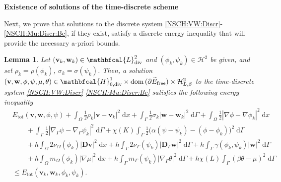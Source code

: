 \documentclass[11pt,reqno]{amsart}
\newtheorem{lemma}[theorem]{Lemma}
\theoremstyle{remark}
\numberwithin{equation}{section}
\newcommand{\abs}[1]{|#1|}
\newcommand{\intO}{\int_\Omega}
\newcommand{\intG}{\int_\Gamma}
\newcommand{\dx}{\;\mathrm{d}x}
\newcommand{\dG}{\;\mathrm d\Ga}
\newcommand{\Grad}{\nabla}
\newcommand{\Div}{\textnormal{div}}
\newcommand{\Gradg}{\nabla_\Ga}
\newcommand{\Om}{\Omega}
\newcommand{\Ga}{\Gamma}
\newcommand{\bv}{\mathbf v}
\newcommand{\bw}{\mathbf w}
\newcommand{\D}{\mathbf D}
\newcommand{\Dg}{\mathbf D_\Ga}
\newcommand{\free}{\mathrm{free}}
\begin{document}
\noindent
\textbf{Existence of solutions of the time-discrete scheme}

Next, we prove that solutions to the discrete system \eqref{NSCH:VW:Discr}-\eqref{NSCH:Mu:Discr:Bc}, if they exist, satisfy a discrete energy inequality that will provide the necessary a-priori bounds.

\begin{lemma}\label{NSCH:Lemma:DiscrEnergyInequality}
    Let $(\bv_k,\bw_k)\in\mathbfcal{L}^2_\Div$ and $(\phi_k,\psi_k)\in\mathcal{H}^2$ be given, and set $\rho_k = \rho(\phi_k)$, $\sigma_k = \sigma(\psi_k)$. Then, a solution $(\bv,\bw,\phi,\psi,\mu,\theta)\in\mathbfcal{H}^1_{0,\Div}\times\mathrm{dom}\,(\partial \widetilde E_\free)\times\mathcal{H}^2_{L,\beta}$ to the time-discrete system \eqref{NSCH:VW:Discr}-\eqref{NSCH:Mu:Discr:Bc} satisfies the following energy inequality
    \begin{align}\label{NSCH:EnergyEstimate:Discr}
        &E_{\mathrm{tot}}(\bv,\bw,\phi,\psi) + \intO \frac12\rho_k\abs{\bv - \bv_k}^2\dx + \intG \frac12\sigma_k\abs{\bw - \bw_k}^2\dG + \intO \frac12\abs{\Grad\phi - \Grad\phi_k}^2\dx \nonumber \\
        &\qquad + \intG \frac12\abs{\Gradg\psi - \Gradg\psi_k}^2\dG + \chi(K)\intG \frac12\big(\alpha(\psi - \psi_k) - (\phi - \phi_k)\big)^2\dG \\
        &\qquad + h\intO 2\nu_\Om(\phi_k)\abs{\D\bv}^2\dx + h\intG 2\nu_\Ga(\psi_k)\abs{\Dg\bw}^2\dG + h\intG\gamma(\phi_k,\psi_k)\abs{\bw}^2\dG \nonumber \\
        &\qquad + h\intO m_\Om(\phi_k)\abs{\Grad\mu}^2\dx + h\intG m_\Ga(\psi_k)\abs{\Gradg\theta}^2\dG + h\chi(L)\intG (\beta\theta - \mu)^2\dG \nonumber \\
        &\leq E_{\mathrm{tot}}(\bv_k,\bw_k,\phi_k,\psi_k). \nonumber
    \end{align}
\end{lemma}
\end{document}
